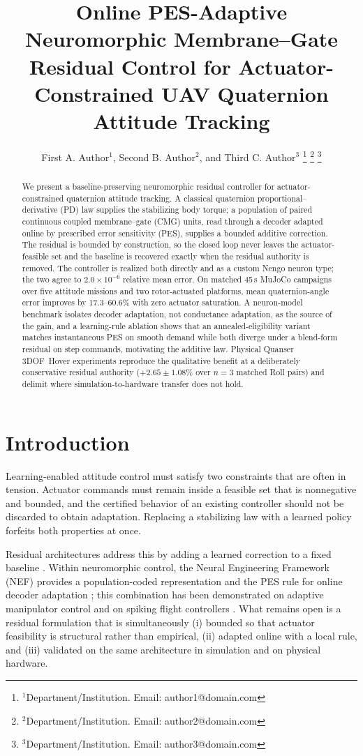 \documentclass[letterpaper,10pt,conference]{IEEEtran}
\title{\LARGE \bf
Online PES-Adaptive Neuromorphic Membrane--Gate Residual Control for
Actuator-Constrained UAV Quaternion Attitude Tracking
}
\author{%
First A. Author$^{1}$, Second B. Author$^{2}$, and Third C. Author$^{3}$%
\thanks{$^{1}$Department/Institution. Email: author1@domain.com}%
\thanks{$^{2}$Department/Institution. Email: author2@domain.com}%
\thanks{$^{3}$Department/Institution. Email: author3@domain.com}%
}
\begin{document}
\maketitle
\thispagestyle{empty}
\pagestyle{empty}

\begin{abstract}
We present a baseline-preserving neuromorphic residual controller for
actuator-constrained quaternion attitude tracking. A classical quaternion
proportional--derivative (PD) law supplies the stabilizing body torque; a
population of paired continuous coupled membrane--gate (CMG) units, read
through a decoder adapted online by prescribed error sensitivity (PES),
supplies a bounded additive correction. The residual is bounded by
construction, so the closed loop never leaves the actuator-feasible set and
the baseline is recovered exactly when the residual authority is removed.
The controller is realized both directly and as a custom Nengo neuron type;
the two agree to $2.0\times10^{-6}$ relative mean error. On matched 45\,s
MuJoCo campaigns over five attitude missions and two rotor-actuated
platforms, mean quaternion-angle error improves by 17.3--60.6\% with zero
actuator saturation. A neuron-model benchmark isolates decoder adaptation,
not conductance adaptation, as the source of the gain, and a learning-rule
ablation shows that an annealed-eligibility variant matches instantaneous
PES on smooth demand while both diverge under a blend-form residual on
step commands, motivating the additive law. Physical Quanser
3DOF~Hover experiments reproduce the qualitative benefit at a deliberately
conservative residual authority ($+2.65\pm1.08\%$ over $n{=}3$ matched Roll
pairs) and delimit where simulation-to-hardware transfer does not hold.
\end{abstract}

\section{Introduction}
\label{sec:introduction}

Learning-enabled attitude control must satisfy two constraints that are
often in tension. Actuator commands must remain inside a feasible set that
is nonnegative and bounded, and the certified behavior of an existing
controller should not be discarded to obtain adaptation. Replacing a
stabilizing law with a learned policy forfeits both properties at once.

Residual architectures address this by adding a learned correction to a
fixed baseline \cite{johannink2019,silver2018,shi2021neural_aug}. Within
neuromorphic control, the Neural Engineering Framework (NEF) provides a
population-coded representation and the PES rule for online decoder
adaptation \cite{eliasmith2004neuraleng,bekolay2014nengo,voelker2015pes};
this combination has been demonstrated on adaptive manipulator control
\cite{dewolf2016arm} and on spiking flight controllers
\cite{stagsted2020,dupeyroux2021neuromorphic}. What remains open is a
residual formulation that is simultaneously (i) bounded so that actuator
feasibility is structural rather than empirical, (ii) adapted online with a
local rule, and (iii) validated on the same architecture in simulation and
on physical hardware.
\end{document}
